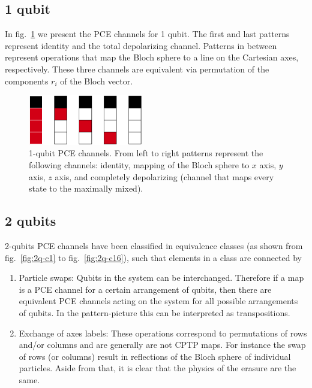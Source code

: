 \documentclass[11pt,dvipsnames]{article} %
\newcommand{\fref}[1]{fig.~\ref{#1}}
\newcommand{\1}{\mathds{1}}
\begin{document}
\subsection*{1 qubit} %
In \fref{fig:1q-ccs} we present the PCE channels for 1 qubit.
The first and last patterns represent identity 
and the total depolarizing channel. 
Patterns in between represent operations that map the Bloch 
sphere to a line on the Cartesian axes, respectively.
These three channels are equivalent via permutation
of the components $r_i$ of the Bloch vector.
\begin{figure}[H]%
	\centering
	\includegraphics[width=5cm]{1q-CCs.png}
	\caption{
1-qubit PCE channels. From left to right patterns represent  
the following channels: identity,
mapping of the Bloch sphere to $x$ axis, $y$ axis, $z$ axis, 
and completely depolarizing (channel that maps every state 
to the maximally mixed).}
	\label{fig:1q-ccs}
\end{figure} %
\subsection*{2 qubits} %
2-qubits PCE channels have been classified in equivalence classes 
(as shown from \fref{fig:2q-c1} to \fref{fig:2q-c16}), such
that elements in a class are connected by
\begin{enumerate}
	\item Particle swaps: Qubits in the system can be interchanged. Therefore
	if a map is a PCE channel for a certain arrangement 
	of qubits, then
	there are equivalent PCE channels acting on the system for all possible
	arrangements of qubits. In the pattern-picture this can be
	interpreted as transpositions.
	\item Exchange of axes labels: These operations correspond to permutations of rows and/or columns and are generally are not CPTP maps. For instance the swap of rows (or columns) result in reflections of the Bloch sphere of individual particles. Aside from that, it is clear that the physics of the erasure are the same.
\end{enumerate}
\end{document}
